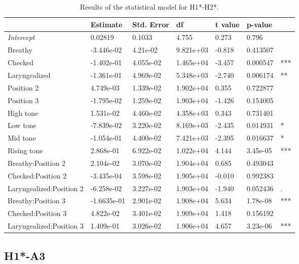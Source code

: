 \documentclass[12pt, letterpaper]{article}
\providecommand{\lsptoprule}{\midrule\toprule}
\providecommand{\lspbottomrule}{\bottomrule\midrule}
\begin{document}
\begin{table}[!h]
  \centering
  \caption{Results of the statistical model for H1*-H2*.}
  \label{tab:H1H2Results}
  \begin{tabular}{lllllll}
    \lsptoprule
     & Estimate & Std. Error & df & t value & p-value & \\ \hline
    \textit{Intercept} & 0.02819 & 0.1033 & 4.755 & 0.273 & 0.796 & \\
    Breathy & -3.446e-02 & 4.21e-02&9.821e+03&-0.818& 0.413507 & \\
    Checked & -1.402e-01 & 4.055e-02 & 1.465e+04 & -3.457 & 0.000547 & *** \\
    Laryngealized & -1.361e-01 &4.969e-02 & 5.348e+03 & -2.740 & 0.006174 & ** \\
    Position 2 & 4.749e-03 & 1.339e-02 & 1.902e+04 & 0.355 & 0.722877 & \\
    Position 3 &-1.795e-02&1.259e-02&1.903e+04&-1.426& 0.154005 & \\
    High tone &1.531e-02&4.460e-02&4.358e+03&0.343& 0.731401 & \\
    Low tone &-7.839e-02&3.220e-02&8.169e+03&-2.435& 0.014931 & * \\
    Mid tone &-1.054e-01&4.400e-02&7.421e+03&-2.395& 0.016637 & *  \\
    Rising tone &2.868e-01&6.922e-02&1.022e+04&4.144&3.45e-05 & *** \\
    Breathy:Position 2 &2.104e-02&3.070e-02&1.904e+04&0.685& 0.493043 & \\
    Checked:Position 2 &-3.435e-04&3.598e-02&1.905e+04&-0.010& 0.992383 & \\
    Laryngealized:Position 2 &-6.258e-02&3.227e-02&1.903e+04&-1.940&0.052436 & .  \\
    Breathy:Position 3 &-1.6635e-01&2.901e-02&1.908e+04&5.634& 1.78e-08 & *** \\
    Checked:Position 3 &4.822e-02&3.401e-02&1.909e+04&1.418&0.156192 & \\
    Laryngealized:Position 3 &1.409e-01&3.026e-02&1.906e+04&4.657&3.23e-06 & *** \\
    \lspbottomrule
  \end{tabular}
\end{table}

\subsection{H1*-A3} \label{sec:H1A3}
\end{document}
